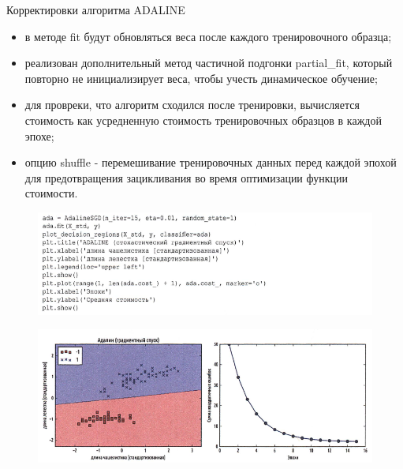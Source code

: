 \documentclass{beamer}
\begin{document}
\begin{frame}[t]{Корректировки алгоритма ADALINE}
\begin{itemize}
\item в методе fit будут обновляться веса после каждого тренировочного образца;
\item реализован дополнительный метод частичной подгонки partial\_fit, который повторно не инициализирует веса, чтобы учесть динамическое обучение;
\item для провреки, что алгоритм сходился после тренировки, вычисляется стоимость как усредненную стоимость тренировочных образцов в каждой эпохе;
\item опцию shuffle - перемешивание тренировочных данных перед каждой эпохой для предотвращения зацикливания во время оптимизации функции стоимости.
\end{itemize}
\end{frame}

\begin{frame}[t]
\begin{figure}[h]
\centering
\includegraphics[scale=0.5]{images/lec03-pic34.png}
\end{figure}
\begin{figure}[h]
\centering
\includegraphics[scale=0.5]{images/lec03-pic35.png}
\end{figure}
\end{frame}
\end{document}
